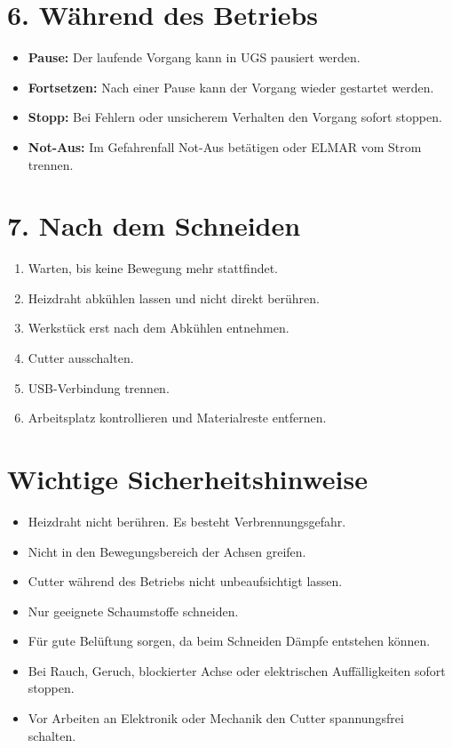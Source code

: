 \documentclass[10pt,a4paper]{article}
\begin{document}
	\section*{6. Während des Betriebs}
	
	\begin{itemize}
		\item \textbf{Pause:} Der laufende Vorgang kann in UGS pausiert werden.
		\item \textbf{Fortsetzen:} Nach einer Pause kann der Vorgang wieder gestartet werden.
		\item \textbf{Stopp:} Bei Fehlern oder unsicherem Verhalten den Vorgang sofort stoppen.
		\item \textbf{Not-Aus:} Im Gefahrenfall Not-Aus betätigen oder ELMAR vom Strom trennen.
	\end{itemize}
	
	\section*{7. Nach dem Schneiden}
	
	\begin{enumerate}
		\item Warten, bis keine Bewegung mehr stattfindet.
		\item Heizdraht abkühlen lassen und nicht direkt berühren.
		\item Werkstück erst nach dem Abkühlen entnehmen.
		\item Cutter ausschalten.
		\item USB-Verbindung trennen.
		\item Arbeitsplatz kontrollieren und Materialreste entfernen.
	\end{enumerate}
	
	\section*{Wichtige Sicherheitshinweise}
	
	\begin{itemize}
		\item Heizdraht nicht berühren. Es besteht Verbrennungsgefahr.
		\item Nicht in den Bewegungsbereich der Achsen greifen.
		\item Cutter während des Betriebs nicht unbeaufsichtigt lassen.
		\item Nur geeignete Schaumstoffe schneiden.
		\item Für gute Belüftung sorgen, da beim Schneiden Dämpfe entstehen können.
		\item Bei Rauch, Geruch, blockierter Achse oder elektrischen Auffälligkeiten sofort stoppen.
		\item Vor Arbeiten an Elektronik oder Mechanik den Cutter spannungsfrei schalten.
	\end{itemize}
	
\end{document}
